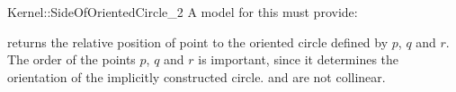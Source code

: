 \begin{ccRefFunctionObjectConcept}{Kernel::SideOfOrientedCircle_2}
A model for this must provide:


         {returns the relative position of point 
          to the oriented circle defined by $p$, $q$ and $r$.
          The order of the points $p$, $q$ and $r$ is important,
          since it determines the orientation of the implicitly
          constructed circle.
          \ccPrecond {} and  are not collinear.}

\ccSeeAlso
{} \\


\end{ccRefFunctionObjectConcept}
